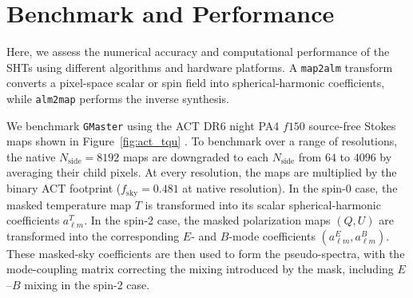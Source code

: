 \documentclass[letters,usenatbib,useAMS]{mnras}
\begin{document}


\section{Benchmark and Performance}
\label{sec:performance}

Here, we assess the numerical accuracy and computational performance of the SHTs using different algorithms and hardware platforms. A \texttt{map2alm} transform converts a pixel-space scalar or spin field into spherical-harmonic coefficients, while \texttt{alm2map} performs the inverse synthesis.

We benchmark \texttt{GMaster} using the ACT DR6 night PA4 $f150$ source-free Stokes maps shown in Figure~\ref{fig:act_tqu} \citep{naess2025}. To benchmark over a range of resolutions, the native $N_{\mathrm{side}}=8192$ maps are downgraded to each $N_{\mathrm{side}}$ from $64$ to $4096$ by averaging their child pixels. At every resolution, the maps are multiplied by the binary ACT footprint ($f_{\mathrm{sky}}=0.481$ at native resolution). In the spin-0 case, the masked temperature map $T$ is transformed into its scalar spherical-harmonic coefficients $a^T_{\ell m}$. In the spin-2 case, the masked polarization maps $(Q,U)$ are transformed into the corresponding $E$- and $B$-mode coefficients $(a^E_{\ell m},a^B_{\ell m})$. These masked-sky coefficients are then used to form the pseudo-spectra, with the mode-coupling matrix correcting the mixing introduced by the mask, including $E$--$B$ mixing in the spin-2 case.
\end{document}
